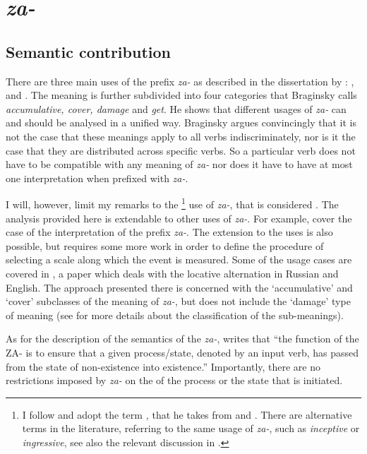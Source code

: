 \section{\textit{za-}}\label{subsection:semantics:za}
\subsection{Semantic contribution}
There are three main uses of the prefix \textit{za-} as described in the dissertation by \citet{Braginsky:08}: ,  and . The  meaning is further subdivided into four categories that Braginsky calls \textit{accumulative, cover, damage} and \textit{get}. He shows that different usages of \textit{za-} can and should be analysed in a unified way. Braginsky argues convincingly that it is not the case that these meanings apply to all verbs indiscriminately, nor is it the case that they are distributed across specific verbs. So a particular verb does not have to be compatible with any meaning of \textit{za-} nor does it have to have at most one interpretation when prefixed with \textit{za-}.

I will, however, limit my remarks to the \footnote{I follow \citet{Braginsky:08} and adopt the term \textit{,} that he takes from \citet{Zemskaja:55} and \citet{Zaliznjak:95}. There are alternative terms in the literature, referring to the same usage of \textit{za-}, such as \textit{inceptive} or \textit{ingressive}, see also the relevant discussion in \citealt{Maslov:65}.} use of \textit{za-}, that is considered . The analysis provided here is extendable to other uses of \textit{za-}. For example, \cite{ZinovaOsswald:paper} cover the case of the  interpretation of the prefix \textit{za-}. The extension to the  uses is also possible, but requires some more work in order to define the procedure of selecting a scale along which the event is measured. Some of the  usage cases are covered in \citet{Zinova:14}, a paper which deals with the locative alternation in Russian and English. The approach presented there is concerned with the `accumulative' and `cover' subclasses of the  meaning of \textit{za-}, but does not include the `damage' type of meaning (see \citealt{Braginsky:08} for more details about the classification of the  sub-meanings).

As for the description of the semantics of the  \textit{za-}, \citet{Braginsky:08} writes \citep[following][]{Sheljakin:69} that ``the function of the  ZA- is to ensure that a given process\slash state, denoted by an input verb, has passed from the state of non-existence into existence.'' Importantly, there are no restrictions imposed by \textit{za-} on the  of the process or the state that is initiated.


